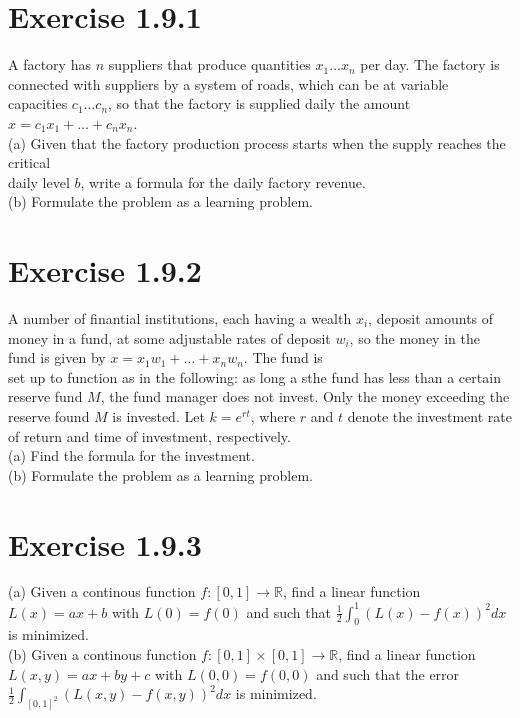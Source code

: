 \documentclass{article}
\begin{document}
\section*{Exercise 1.9.1}


A factory has $n$ suppliers that produce quantities $x_1 \dots x_n$ per day. The factory is connected with suppliers by a system of roads, which
can be at variable capacities $c_1 \dots c_n$, so that the factory is supplied
daily the amount $x = c_1 x_1 + \dots + c_n x_n$.\\
(a) Given that the factory production process starts when the supply reaches the critical \\ 
daily level $b$, write a formula for the daily factory revenue.\\
(b) Formulate the problem as a learning problem.

\section*{Exercise 1.9.2}


A number of finantial institutions, each having a wealth $x_i$, deposit amounts of money in a fund, at some adjustable rates of 
deposit $w_i$, so the money in the fund is given by $x = x_1 w_1 + \dots + x_n w_n$. The fund is \\
set up to function as in the following: as long a sthe fund has less than a certain reserve fund $M$, the fund manager does not invest. Only the
money exceeding the reserve found $M$ is invested. Let $k = e ^ {r t}$, where $r$ and $t$ denote the investment rate of return and time of investment, respectively.\\
(a) Find the formula for the investment. \\
(b) Formulate the problem as a learning problem.

\section*{Exercise 1.9.3}


(a) Given a continous function $f: [0,1] \rightarrow \mathbb{R}$, find a linear function $L(x) = ax + b$ with $L(0) = f(0)$ and such that 
$\frac{1}{2} \int^{1}_{0}(L(x) - f(x))^2 dx$ is minimized.\\
(b) Given a continous function $f: [0,1] \times [0,1] \rightarrow \mathbb{R}$, find a linear function $L(x,y) = ax + by + c$ with $L(0,0) = f(0,0)$ and 
such that the error $\frac{1}{2} \int_{[0,1]^2}(L(x,y) - f(x,y))^2 dx$ is minimized.
\end{document}
